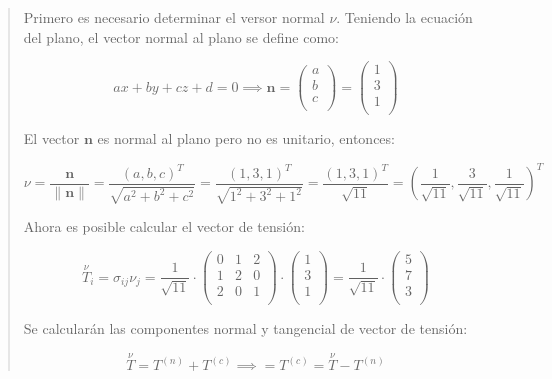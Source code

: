 \documentclass[a4paper,12pt,twoside,final,spanish]{article}
\begin{document}
\begin{quote}


Primero es necesario determinar el versor normal $\nu$. Teniendo la ecuación del plano, el vector normal al plano se define como:

\[
ax+by+cz+d=0\implies \mathbf{n}=
\left(\begin{matrix}
a \\
b \\
c \\
\end{matrix}\right)
=
\left(\begin{matrix}
1 \\
3 \\
1 \\
\end{matrix}\right)
\]

El vector $\mathbf{n}$ es normal al plano pero no es unitario, entonces:

\[
\nu=\frac{\mathbf{n}}{\|\mathbf{n}\|}=\frac{(a,b,c)^{T}}{\sqrt{a^2+b^2+c^2}}
=\frac{(1,3,1)^{T}}{\sqrt{1^2+3^2+1^2}}=\frac{(1,3,1)^{T}}{\sqrt{11}}
=\left(\frac{1}{\sqrt{11}},\frac{3}{\sqrt{11}},\frac{1}{\sqrt{11}}\right)^{T}
\]

Ahora es posible calcular el vector de tensión:

\[
\stackrel \nu T_{i}=\sigma_{ij}\nu_{j}=\frac{1}{\sqrt{11}}\cdot
\left(\begin{matrix}
0 & 1 & 2\\
1 & 2 & 0\\
2 & 0 & 1\\
\end{matrix}\right)\cdot
\left(\begin{matrix}
1 \\
3 \\
1 \\
\end{matrix}\right)=\frac{1}{\sqrt{11}}\cdot
\left(\begin{matrix}
5 \\
7 \\
3 \\
\end{matrix}\right)
\]

Se calcularán las componentes normal y tangencial de vector de tensión:

\[
\stackrel \nu T=T^{(n)}+T^{(c)}\implies=T^{(c)}=\stackrel \nu T-T^{(n)}
\]


\end{quote}
\end{document}
